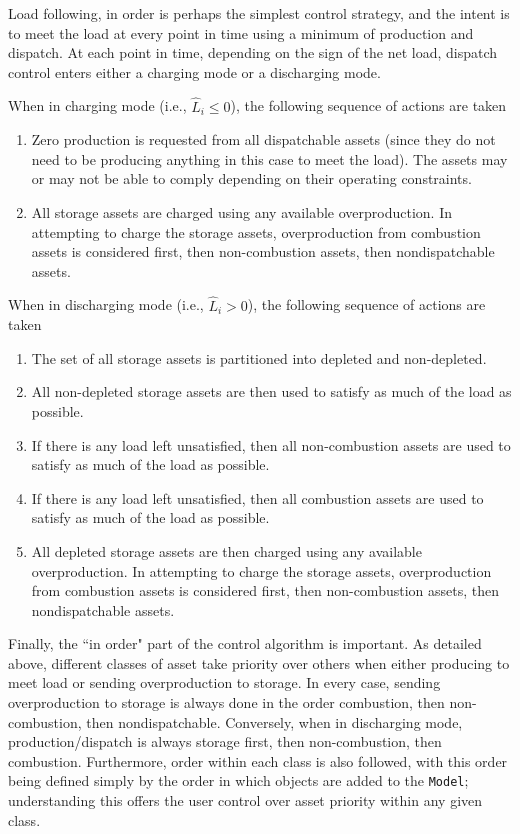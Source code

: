 \documentclass[12pt, letterpaper]{report}
\begin{document}
Load following, in order is perhaps the simplest control strategy, and the intent is to meet the load at every point in time using a minimum of production and dispatch. At each point in time, depending on the sign of the net load, dispatch control enters either a charging mode or a discharging mode.\par 
When in charging mode (i.e., $\widehat{L}_i \leq 0$), the following sequence of actions are taken

\begin{enumerate}
    \item Zero production is requested from all dispatchable assets (since they do not need to be producing anything in this case to meet the load). The assets may or may not be able to comply depending on their operating constraints.
    \item All storage assets are charged using any available overproduction. In attempting to charge the storage assets, overproduction from combustion assets is considered first, then non-combustion assets, then nondispatchable assets.
\end{enumerate}

When in discharging mode (i.e., $\widehat{L}_i > 0$), the following sequence of actions are taken

\begin{enumerate}
    \item The set of all storage assets is partitioned into depleted and non-depleted.
    \item All non-depleted storage assets are then used to satisfy as much of the load as possible.
    \item If there is any load left unsatisfied, then all non-combustion assets are used to satisfy as much of the load as possible.
    \item If there is any load left unsatisfied, then all combustion assets are used to satisfy as much of the load as possible.
    \item All depleted storage assets are then charged using any available overproduction. In attempting to charge the storage assets, overproduction from combustion assets is considered first, then non-combustion assets, then nondispatchable assets.
\end{enumerate}

Finally, the ``in order" part of the control algorithm is important. As detailed above, different classes of asset take priority over others when either producing to meet load or sending overproduction to storage. In every case, sending overproduction to storage is always done in the order combustion, then non-combustion, then nondispatchable. Conversely, when in discharging mode, production/dispatch is always storage first, then non-combustion, then combustion. Furthermore, order within each class is also followed, with this order being defined simply by the order in which objects are added to the \texttt{Model}; understanding this offers the user control over asset priority within any given class.
\end{document}
